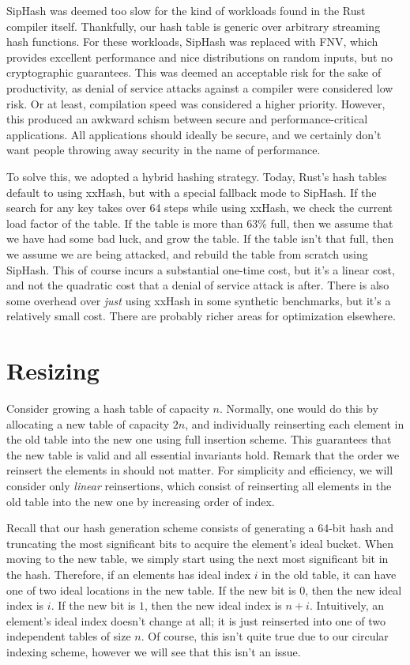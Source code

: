 \documentclass{cccg13}
\begin{document}
SipHash was deemed too slow for the kind of workloads found in the Rust
compiler itself. Thankfully, our hash table is generic over arbitrary
streaming hash functions. For these workloads, SipHash was replaced with FNV,
which provides excellent performance and nice distributions on random inputs,
but no cryptographic guarantees. This was deemed an acceptable risk for the
sake of productivity, as denial of service attacks against a compiler were
considered low risk. Or at least, compilation speed was considered a higher
priority. However, this produced an awkward schism between secure and
performance-critical applications. All applications should ideally be secure,
and we certainly don't want people throwing away security in the name of
performance.

To solve this, we adopted a hybrid hashing strategy. Today, Rust's hash tables
default to using xxHash, but with a special fallback mode to SipHash. If the
search for any key takes over 64 steps while using xxHash, we check the
current load factor of the table. If the table is more than 63\% full, then we
assume that we have had some bad luck, and grow the table. If the table isn't
that full, then we assume we are being attacked, and rebuild the table from
scratch using SipHash. This of course incurs a substantial one-time cost, but
it's a linear cost, and not the quadratic cost that a denial of service attack
is after. There is also some overhead over \emph{just} using xxHash in some
synthetic benchmarks, but it's a relatively small cost. There are probably
richer areas for optimization elsewhere.





\section{Resizing}

Consider growing a hash table of capacity $n$. Normally, one would do this by
allocating a new table of capacity $2n$, and individually reinserting each
element in the old table into the new one using full insertion scheme. This
guarantees that the new table is valid and all essential invariants hold.
Remark that the order we reinsert the elements in should not
matter. For simplicity and efficiency, we will consider only \emph{linear}
reinsertions, which consist of reinserting all elements in the old table into
the new one by increasing order of index.

Recall that our hash generation scheme consists of generating a 64-bit hash
and truncating the most significant bits to acquire the element's ideal
bucket. When moving to the new table, we simply start using the next most
significant bit in the hash. Therefore, if an elements has ideal index $i$ in
the old table, it can have one of two ideal locations in the new table. If the
new bit is $0$, then the new ideal index is $i$. If the new bit is $1$, then
the new ideal index is $n + i$. Intuitively, an element's ideal index doesn't
change at all; it is just reinserted into one of two independent tables of
size $n$. Of course, this isn't quite true due to our circular indexing
scheme, however we will see that this isn't an issue.
\end{document}
